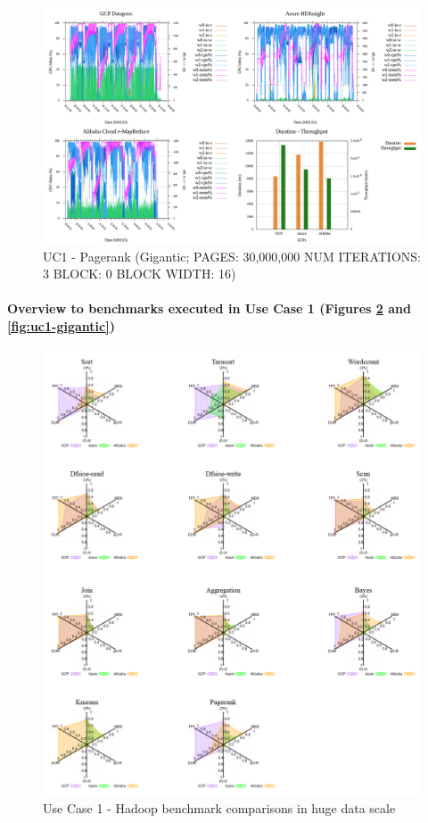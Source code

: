 \documentclass[review]{elsarticle}
\begin{document}
\begin{figure}[p]
	\caption{UC1 - Pagerank (Gigantic; PAGES: 30,000,000 NUM ITERATIONS: 3 BLOCK: 0 BLOCK WIDTH: 16)}
	\label{fig:uc1-page-g-cmidt}
	\includegraphics[width=\textwidth]{uc1-page-g-cmidt}
	\centering
\end{figure}




\paragraph{Overview to benchmarks executed in Use Case 1 (Figures \ref{fig:uc1-huge} and \ref{fig:uc1-gigantic})} 

\begin{figure}[p]
	\caption{Use Case 1 - Hadoop benchmark comparisons in huge data scale}
	\label{fig:uc1-huge}
	\includegraphics[width=\textwidth]{uc1-huge}
	\centering
\end{figure}
\end{document}
